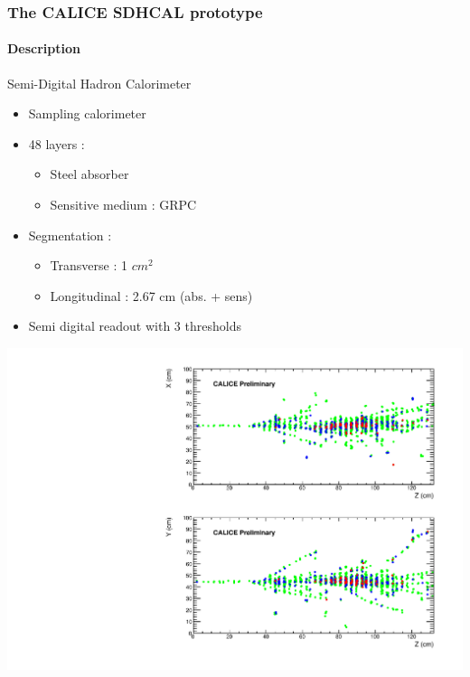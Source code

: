 \documentclass[8pt]{beamer}
\begin{document}
  \begin{frame}
  \frametitle{The CALICE SDHCAL prototype}
  \framesubtitle{Description}
    \begin{minipage}{0.48\linewidth}
      \begin{block}{Semi-Digital Hadron Calorimeter}
        \begin{itemize}
          \item Sampling calorimeter
          \item 48 layers :
          \begin{itemize}
            \item Steel absorber
            \item Sensitive medium : GRPC
          \end{itemize}
          \item Segmentation :
          \begin{itemize}
            \item Transverse : 1 $cm^2$
            \item Longitudinal : 2.67 cm (abs. + sens)
          \end{itemize}
          \item Semi digital readout with 3 thresholds
        \end{itemize}
      \end{block}     
    \end{minipage} \hfill
    \begin{minipage}{0.48\linewidth}
      \includegraphics[width=\linewidth]{sdhcal_pion_80GeV.pdf}
    \end{minipage}
    \begin{minipage}{0.58\linewidth}

\end{minipage}
\end{frame}
\end{document}
